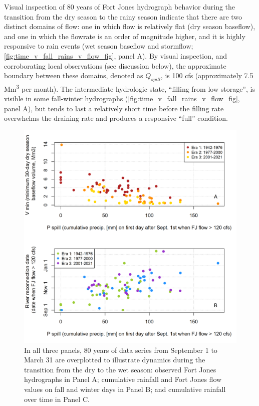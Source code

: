 \documentclass[hess, manuscript]{copernicus}
\begin{document}
Visual inspection of 80 years of Fort Jones hydrograph behavior during
the transition from the dry season to the rainy season indicate that
there are two distinct domains of flow: one in which flow is relatively
flat (dry season baseflow), and one in which the flowrate is an order of
magnitude higher, and it is highly responsive to rain events (wet season
baseflow and stormflow; \autoref{fig:time_v_fall_rains_v_flow_fig},
panel A). By visual inspection, and corroborating local observations
(see discussion below), the approximate boundary between these domains,
denoted as \(Q_{spill}\), is 100 cfs (approximately 7.5
Mm\textsuperscript{3} per month). The intermediate hydrologic state,
``filling from low storage'', is visible in some fall-winter hydrographs
(\autoref{fig:time_v_fall_rains_v_flow_fig}, panel A), but tends to last
a relatively short time before the filling rate overwhelms the draining
rate and produces a responsive ``full'' condition.

\begin{figure}
\includegraphics[width=1\linewidth]{f04} \caption{\label{fig:time_v_fall_rains_v_flow_fig} In all three panels, 80 years of data series from September 1 to March 31 are overplotted to illustrate dynamics during the transition from the dry to the wet season: observed Fort Jones hydrographs in Panel A; cumulative rainfall and Fort Jones flow values on fall and winter days in Panel B; and cumulative rainfall over time in Panel C.}\label{fig:time_v_fall_rains_v_flow_fig}
\end{figure}
\end{document}
